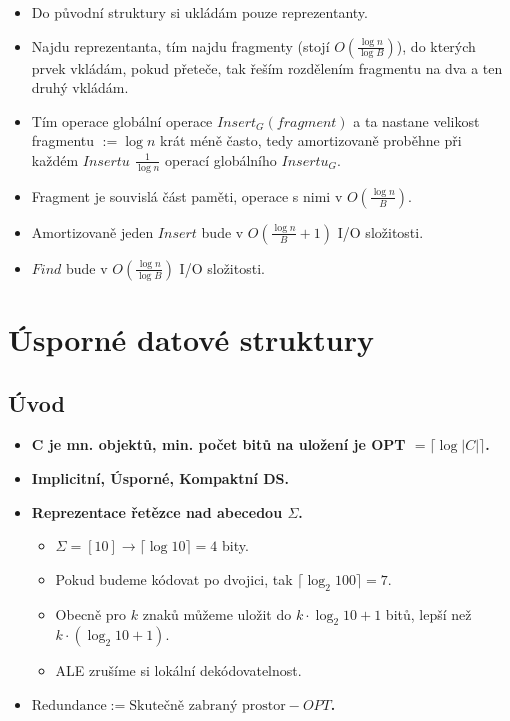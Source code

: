 \documentclass[11pt,a4paper]{article}
\begin{document}
\begin{itemize}
\begin{itemize}
        \item Do původní struktury si ukládám pouze reprezentanty.
        \item Najdu reprezentanta, tím najdu fragmenty (stojí $O(\frac{\log n}{\log B})$), do kterých prvek vkládám, pokud přeteče, tak řeším rozdělením fragmentu na dva a ten druhý vkládám.
        \item Tím operace globální operace $Insert_G(fragment)$ a ta nastane velikost fragmentu $:= \log n$ krát méně často, tedy amortizovaně proběhne při každém $Insertu$ $\frac{1}{\log n}$ operací globálního $Insertu_G$.
        \item Fragment je souvislá část paměti, operace s nimi v $O(\frac{\log n}{B})$.
        \item Amortizovaně jeden $Insert$ bude v $O(\frac{\log n}{B} + 1)$ I/O složitosti.
        \item $Find$ bude v $O(\frac{\log n}{\log B})$ I/O složitosti.
    \end{itemize}
\end{itemize}
\section{Úsporné datové struktury}
\subsection{Úvod}
\begin{itemize}
    \item \textbf{C je mn. objektů, min. počet bitů na uložení je OPT $=\lceil{\log|C|}\rceil$.}
    \item \textbf{Implicitní, Úsporné, Kompaktní DS.}
    \item \textbf{Reprezentace řetězce nad abecedou $\Sigma$.}
    \begin{itemize}
        \item $\Sigma = [10] \rightarrow \lceil\log10\rceil = 4$ bity.
        \item Pokud budeme kódovat po dvojici, tak $\lceil\log_2{100}\rceil = 7$.
        \item Obecně pro $k$ znaků můžeme uložit do $k \cdot \log_2{10}+1$ bitů, lepší než $k \cdot (\log_2{10}+1)$.
        \item ALE zrušíme si lokální dekódovatelnost.
    \end{itemize}
    \item \textbf{$\text{Redundance} := \text{Skutečně zabraný prostor} - OPT$.}
\end{itemize}
\end{document}
